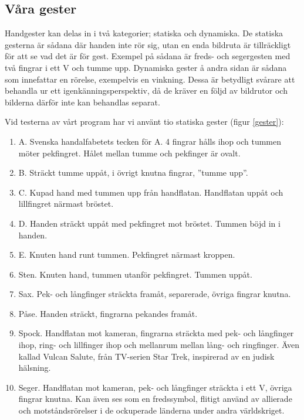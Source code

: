 \documentclass[../rapport_MVEX01-11-05]{subfiles}
\begin{document}
\subsection{Våra gester}
Handgester kan delas in i två kategorier; statiska och dynamiska. De
statiska gesterna är sådana där handen inte rör sig, utan en enda
bildruta är tillräckligt för att se vad det är för gest. Exempel på
sådana är freds- och segergesten med två fingrar i ett V och tumme
upp. Dynamiska gester å andra sidan är sådana som innefattar en
rörelse, exempelvis en vinkning. Dessa är betydligt svårare att
behandla ur ett igenkänningsperspektiv, då de kräver en följd av
bildrutor och bilderna därför inte kan behandlas separat.

Vid testerna av vårt program har vi använt tio statiska gester (figur
\ref{gester}):


\begin{enumerate}
\item A. Svenska handalfabetets tecken för A. 4 fingrar hålls ihop och tummen
  möter pekfingret. Hålet mellan tumme och pekfinger är ovalt.

\item B. Sträckt tumme uppåt, i övrigt knutna fingrar, ''tumme upp''.

\item C. Kupad hand med tummen upp från handflatan. Handflatan uppåt
  och lillfingret närmast bröstet. 

\item D. Handen sträckt uppåt med pekfingret mot bröstet. Tummen böjd
  in i handen.

\item E. Knuten hand runt tummen. Pekfingret närmast kroppen. 

\item Sten. Knuten hand, tummen utanför pekfingret. Tummen uppåt.

\item Sax. Pek- och långfinger sträckta framåt, separerade, övriga
  fingrar knutna.

\item Påse. Handen sträckt, fingrarna pekandes framåt.

\item Spock. Handflatan mot kameran, fingrarna sträckta med pek- och
  långfinger ihop, ring- och lillfinger ihop och mellanrum mellan
  lång- och ringfinger. Även kallad Vulcan Salute, från TV-serien Star
  Trek, inspirerad av en judisk hälsning.

\item Seger. Handflatan mot kameran, pek- och långfinger sträckta i
  ett V, övriga fingrar knutna. Kan även ses som en fredssymbol,
  flitigt använd av allierade och motståndsrörelser i de ockuperade
  länderna under andra världskriget.
\end{enumerate}
\end{document}
